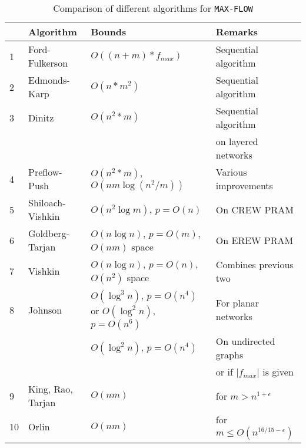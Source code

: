 \documentclass[a4paper,10pt, twocolumn]{article}
\begin{document}
\begin{table*}
\begin{center}
\begin{tabular}{llll}
\hline
&\textbf{Algorithm} & \textbf{Bounds} & \textbf{Remarks} \\
\hline
1 & Ford-Fulkerson\cite{ahuja93} & $O((n+m) * f_{max})$ & Sequential algorithm \\
2 & Edmonds-Karp\cite{ahuja93} & $O(n*m^2)$ & Sequential algorithm  \\
3 & Dinitz\cite{dinitz70}& $O(n^2*m)$ & Sequential algorithm \\
  & & & on layered networks\\
4 & Preflow-Push\cite{ahuja93} & $O(n^2*m)$, $O(nm \log(n^2/m))$ & Various improvements\\
5 & Shiloach-Vishkin\cite{yossi81} & $O(n^2 \log m)$, $p=O(n)$ & On CREW PRAM\\
6 & Goldberg-Tarjan\cite{goldberg89} & $O(n \log n)$, $p=O(m)$, $O(nm)$ space & On EREW PRAM \\
7 & Vishkin\cite{vishkin92} & $O(n \log n)$, $p=O(n)$, $O(n^2)$ space & Combines previous two\\
8 & Johnson\cite{johnson87} & $O(\log^{3} n)$, $p=O(n^{4})$ or $O(\log^{2} n)$, $p=O(n^{6})$ &
For planar networks\\
  & & $	O(\log^{2} n)$, $p=O(n^{4})$ & On undirected graphs \\
  & & & or if  $\lvert f_{max} \rvert$ is given\\
9 & King, Rao, Tarjan\cite{King94} & $O(nm)$ & for $m > n^{1+\epsilon}$ \\
10 & Orlin\cite{Orlin13} & $O(nm)$ & for $m \leq O(n^{16/15 - \epsilon})$ \\
\hline
\end{tabular}
\caption{Comparison of different algorithms for \lstinline|MAX-FLOW|}
\label{tbl:results}
\end{center}
\end{table*}
\end{document}
